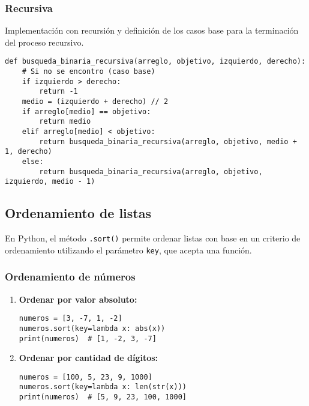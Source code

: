 \documentclass[12pt,letterpaper]{article}
\begin{document}
\subsubsection{Recursiva}

Implementación con recursión y definición de los casos base para la terminación del proceso recursivo.

\begin{verbatim}
def busqueda_binaria_recursiva(arreglo, objetivo, izquierdo, derecho):
    # Si no se encontro (caso base)
    if izquierdo > derecho:
        return -1
    medio = (izquierdo + derecho) // 2
    if arreglo[medio] == objetivo:
        return medio
    elif arreglo[medio] < objetivo:
        return busqueda_binaria_recursiva(arreglo, objetivo, medio + 1, derecho)
    else:
        return busqueda_binaria_recursiva(arreglo, objetivo, izquierdo, medio - 1)
\end{verbatim}

\subsection{Ordenamiento de listas}

En Python, el método \texttt{.sort()} permite ordenar listas con base en un criterio de ordenamiento utilizando el parámetro \texttt{key}, que acepta una función.

\subsubsection{Ordenamiento de números}

\begin{enumerate}
  \item \textbf{Ordenar por valor absoluto:}

\begin{verbatim}
numeros = [3, -7, 1, -2]
numeros.sort(key=lambda x: abs(x))
print(numeros)  # [1, -2, 3, -7]
\end{verbatim}

  \item \textbf{Ordenar por cantidad de dígitos:}

\begin{verbatim}
numeros = [100, 5, 23, 9, 1000]
numeros.sort(key=lambda x: len(str(x)))
print(numeros)  # [5, 9, 23, 100, 1000]
\end{verbatim}

\end{enumerate}
\end{document}
